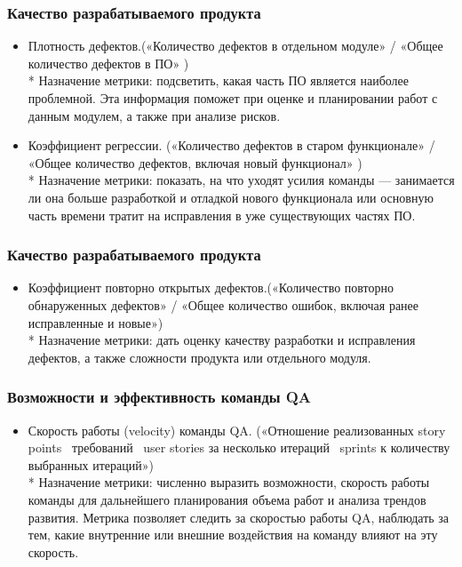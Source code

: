 \documentclass{../industrial-development}
\begin{document}
	\begin{frame} \frametitle{Качество разрабатываемого продукта}
		\begin{itemize}
			\item Плотность дефектов.(«Количество дефектов в отдельном модуле» / «Общее количество дефектов в ПО» 
			)
			\\* Назначение метрики: подсветить, какая часть ПО является наиболее проблемной. Эта информация поможет при оценке и планировании работ с данным модулем, а также при анализе рисков.
			\item Коэффициент регрессии. («Количество дефектов в старом функционале» / «Общее количество дефектов, включая новый функционал» )
			\\* Назначение метрики: показать, на что уходят усилия команды — занимается ли она больше разработкой и отладкой нового функционала или основную часть времени тратит на исправления в уже существующих частях ПО.
			
		\end{itemize}
	\end{frame}

	\begin{frame} \frametitle{Качество разрабатываемого продукта}
		\begin{itemize}
			\item Коэффициент повторно открытых дефектов.(«Количество повторно обнаруженных дефектов» / «Общее количество ошибок, включая ранее исправленные и новые»)
			\\* Назначение метрики: дать оценку качеству разработки и исправления дефектов, а также сложности продукта или отдельного модуля.
			
		\end{itemize}
	\end{frame}

	\begin{frame} \frametitle{Возможности и эффективность команды QA}
		\begin{itemize}
			\item Скорость работы (velocity) команды QA. («Отношение реализованных story points \ требований \ user stories за несколько итераций \ sprints к количеству выбранных итераций»)
			\\* Назначение метрики: численно выразить возможности, скорость работы команды для дальнейшего планирования объема работ и анализа трендов развития. Метрика позволяет следить за скоростью работы QA, наблюдать за тем, какие внутренние или внешние воздействия на команду влияют на эту скорость.
		\end{itemize}
	\end{frame}
\end{document}
